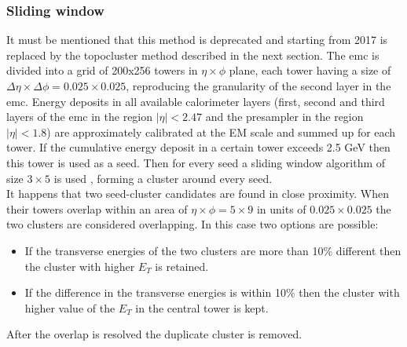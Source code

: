      \subsubsection{Sliding window}
     It must be mentioned that this method is deprecated and starting from 2017 is replaced by the topocluster method described in the next section. 
     The \gls{emc} is divided into a grid of 200x256 towers in $\eta \times \phi$ plane, each tower having a size of $\Delta \eta \times \Delta \phi=0.025\times0.025$, reproducing the granularity of the second layer in the \gls{emc}. Energy deposits in all available calorimeter layers (first, second and third layers of the \gls{emc} in the region $|\eta| < 2.47$ and the presampler in the region $|\eta| < 1.8$) are approximately calibrated at the EM scale and summed up for each tower. If the cumulative energy deposit in a certain tower exceeds 2.5 GeV then this tower is used as a seed. Then for every seed a sliding window algorithm of size $3 \times 5$ is used \cite{Lampl:1099735}, forming a cluster around every seed. \\
     It happens that two seed-cluster candidates are found in close proximity. When their towers overlap within an area of $\eta \times \phi=5\times 9$ in units of $0.025\times0.025$ the two clusters are considered overlapping. In this case two options are possible:
      \begin{itemize}
     	\item If the transverse energies of the two clusters are more than 10\% different then the cluster with higher $E_T$ is retained.
     	\item If the difference in the transverse energies is within 10\% then the cluster with higher value of the $E_T$ in the central tower is kept.
     \end{itemize}
 	After the overlap is resolved the duplicate cluster is removed.\\
